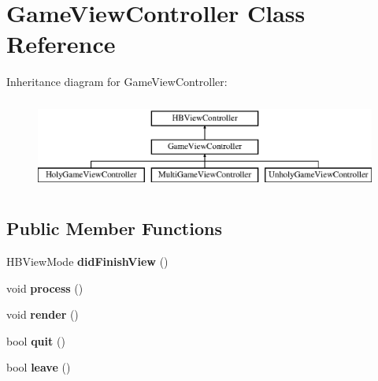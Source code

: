 \hypertarget{class_game_view_controller}{\section{Game\-View\-Controller Class Reference}
\label{class_game_view_controller}
}
Inheritance diagram for Game\-View\-Controller\-:\begin{figure}[H]
\begin{center}
\leavevmode
\includegraphics[height=3.000000cm]{class_game_view_controller}
\end{center}
\end{figure}
\subsection*{Public Member Functions}
\begin{DoxyCompactItemize}
\item 
\hypertarget{class_game_view_controller_a9cc7d13073c12187e8c7d9aa89727f31}{H\-B\-View\-Mode {\bfseries did\-Finish\-View} ()}\label{class_game_view_controller_a9cc7d13073c12187e8c7d9aa89727f31}

\item 
\hypertarget{class_game_view_controller_a6cb003b6eaf79a580a60d9957274023c}{void {\bfseries process} ()}\label{class_game_view_controller_a6cb003b6eaf79a580a60d9957274023c}

\item 
\hypertarget{class_game_view_controller_a92ffa5042982ee85cf302aea16f5e3ca}{void {\bfseries render} ()}\label{class_game_view_controller_a92ffa5042982ee85cf302aea16f5e3ca}

\item 
\hypertarget{class_game_view_controller_a628bd4d9a18bc85f6ce675cf138dbdf0}{bool {\bfseries quit} ()}\label{class_game_view_controller_a628bd4d9a18bc85f6ce675cf138dbdf0}

\item 
\hypertarget{class_game_view_controller_a93c9963feef7c3558632b2cec9264045}{bool {\bfseries leave} ()}\label{class_game_view_controller_a93c9963feef7c3558632b2cec9264045}

\end{DoxyCompactItemize}
